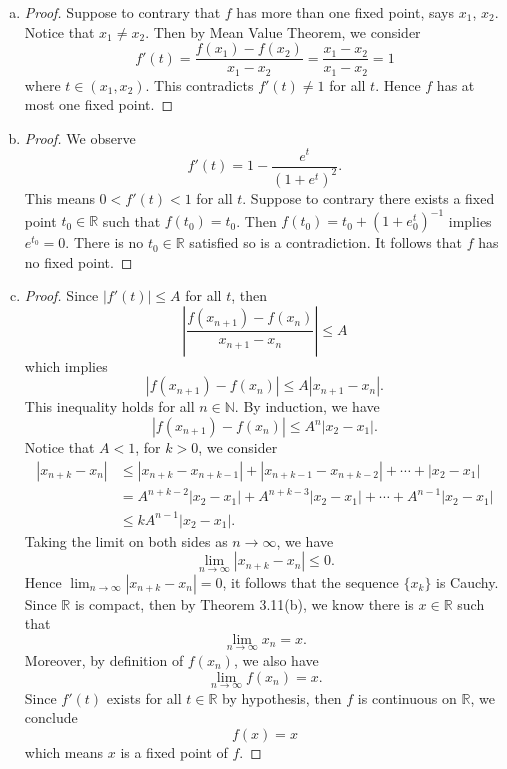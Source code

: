 \begin{Exercise}
	\begin{enumerate}[(a)]
		\item 
		\begin{proof}
			Suppose to contrary that $f$ has more than one fixed point, says $x_1$, $x_2$.
			Notice that $x_1\neq x_2$.
			Then by Mean Value Theorem, we consider
			$$
			f'(t) = \frac{f(x_1)-f(x_2)}{x_1-x_2}
			= \frac{x_1-x_2}{x_1-x_2}
			=1
			$$
			where $t\in (x_1,x_2)$.
			This contradicts $f'(t) \neq 1$ for all $t$.
			Hence $f$ has at most one fixed point.
		\end{proof}
		
		\item
		\begin{proof}
			We observe
			$$
			f'(t) = 1-\frac{e^t}{(1+e^t)^2}.
			$$
			This means $0<f'(t)<1$ for all $t$.
			Suppose to contrary there exists a fixed point $t_0\in\mathbb{R}$ such that $f(t_0) = t_0$.
			Then $f(t_0) = t_0 + (1+e^t_0)^{-1}$ implies $e^{t_0} = 0$.
			There is no $t_0\in\mathbb{R}$ satisfied so is a contradiction.
			It follows that $f$ has no fixed point.
		\end{proof}
		
		\item
		\begin{proof}
			Since $|f'(t)| \leq A$ for all $t$, then
			$$
			\left| \frac{f(x_{n+1})-f(x_n)}{x_{n+1}-x_n} \right | \leq A
			$$
			which implies
			$$
			\left| f(x_{n+1})-f(x_n) \right| \leq A \left| x_{n+1}-x_n \right|.
			$$
			This inequality holds for all $n\in\mathbb{N}$. By induction, we have
			$$
			|f(x_{n+1})-f(x_n)| \leq A^n | x_2-x_1 |.
			$$
			Notice that $A < 1$, for $k > 0$, we consider
			\begin{align*}
			| x_{n+k} - x_n |
			&\leq |x_{n+k}-x_{n+k-1}| + |x_{n+k-1}-x_{n+k-2}| + \cdots + | x_2 - x_1 | \\
			&= A^{n+k-2} |x_2-x_1| + A^{n+k-3} |x_2-x_1| + \cdots + A^{n-1} |x_2 - x_1| \\
			&\leq k A^{n-1} | x_2-x_1 |.
			\end{align*}
			Taking the limit on both sides as $n\to\infty$, we have
			$$
			\lim_{n\to\infty} |x_{n+k}-x_n| \leq 0.
			$$
			Hence $\lim_{n\to\infty}|x_{n+k}-x_n| = 0$, it follows that the sequence $\{x_k\}$ is Cauchy.
			Since $\mathbb{R}$ is compact, then by Theorem 3.11(b), we know there is $x\in\mathbb{R}$ such that 
			$$
			\lim_{n\to\infty} x_n = x.
			$$
			Moreover, by definition of $f(x_n)$, we also have 
			$$
			\lim_{n\to\infty} f(x_n) = x.
			$$
			Since $f'(t)$ exists for all $t\in\mathbb{R}$ by hypothesis, then $f$ is continuous on $\mathbb{R}$, we conclude
			$$
			f(x) = x
			$$
			which means $x$ is a fixed point of $f$.
		\end{proof}
		

\end{enumerate}
\end{Exercise}
